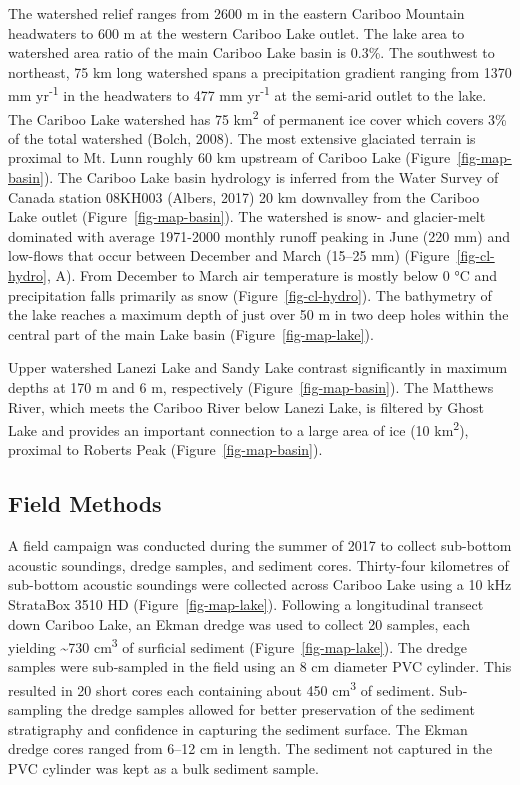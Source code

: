 \documentclass[
  letterpaper,
  DIV=11,
  numbers=noendperiod]{scrartcl}
\begin{document}
The watershed relief ranges from 2600 m in the eastern Cariboo Mountain
headwaters to 600 m at the western Cariboo Lake outlet. The lake area to
watershed area ratio of the main Cariboo Lake basin is 0.3\%. The
southwest to northeast, 75 km long watershed spans a precipitation
gradient ranging from 1370 mm yr\textsuperscript{-1} in the headwaters
to 477 mm yr\textsuperscript{-1} at the semi-arid outlet to the lake.
The Cariboo Lake watershed has 75 km\textsuperscript{2} of permanent ice
cover which covers 3\% of the total watershed (Bolch, 2008). The most
extensive glaciated terrain is proximal to Mt. Lunn roughly 60 km
upstream of Cariboo Lake (Figure~\ref{fig-map-basin}). The Cariboo Lake
basin hydrology is inferred from the Water Survey of Canada station
08KH003 (Albers, 2017) 20 km downvalley from the Cariboo Lake outlet
(Figure~\ref{fig-map-basin}). The watershed is snow- and glacier-melt
dominated with average 1971-2000 monthly runoff peaking in June (220 mm)
and low-flows that occur between December and March (15--25 mm)
(Figure~\ref{fig-cl-hydro}, A). From December to March air temperature
is mostly below 0 °C and precipitation falls primarily as snow
(Figure~\ref{fig-cl-hydro}). The bathymetry of the lake reaches a
maximum depth of just over 50 m in two deep holes within the central
part of the main Lake basin (Figure~\ref{fig-map-lake}).

Upper watershed Lanezi Lake and Sandy Lake contrast significantly in
maximum depths at 170 m and 6 m, respectively
(Figure~\ref{fig-map-basin}). The Matthews River, which meets the
Cariboo River below Lanezi Lake, is filtered by Ghost Lake and provides
an important connection to a large area of ice (10
km\textsuperscript{2}), proximal to Roberts Peak
(Figure~\ref{fig-map-basin}).

\subsection{Field Methods}\label{field-methods}

A field campaign was conducted during the summer of 2017 to collect
sub-bottom acoustic soundings, dredge samples, and sediment cores.
Thirty-four kilometres of sub-bottom acoustic soundings were collected
across Cariboo Lake using a 10 kHz StrataBox 3510 HD
(Figure~\ref{fig-map-lake}). Following a longitudinal transect down
Cariboo Lake, an Ekman dredge was used to collect 20 samples, each
yielding \textasciitilde730 cm\textsuperscript{3} of surficial sediment
(Figure~\ref{fig-map-lake}). The dredge samples were sub-sampled in the
field using an 8 cm diameter PVC cylinder. This resulted in 20 short
cores each containing about 450 cm\textsuperscript{3} of sediment.
Sub-sampling the dredge samples allowed for better preservation of the
sediment stratigraphy and confidence in capturing the sediment surface.
The Ekman dredge cores ranged from 6--12 cm in length. The sediment not
captured in the PVC cylinder was kept as a bulk sediment sample.
\end{document}
